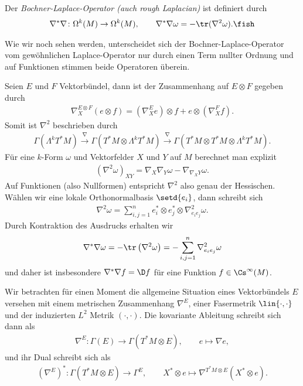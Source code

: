 \documentclass[%
	paper=a5,%
	fleqn,%
	DIV=18,%
	BCOR=0mm,
	fontsize=11pt,
	titlepage=false,%
	bibliography=totoc,
	DIV=18,%
	twoside=true,
	pdftitle=Riemannsche Geometrie,
	pdfauthor=Uwe Semmelmann,
	numbers=noendperiod]%
	{scrbook}
\begin{document}
\begin{defn}
Der \emph{Bochner-Laplace-Operator (auch rough Laplacian)} ist definiert durch
\begin{align*}
\nabla^*\nabla \colon \Omega^k(M)\to \Omega^k(M),\qquad \nabla^*\nabla\omega = - \tr(\nabla^2\omega).\fish
\end{align*}
\end{defn}

Wie wir noch sehen werden, unterscheidet sich der Bochner-Laplace-Operator vom gewöhnlichen Laplace-Operator nur durch einen Term nullter Ordnung und auf Funktionen stimmen beide Operatoren überein.

\begin{rem}
Seien $E$ und $F$ Vektorbündel, dann ist der Zusammenhang auf $E\otimes F$ gegeben durch
\begin{align*}
\nabla_{X}^{E\otimes F} (e\otimes f) = (\nabla_{X}^E e)\otimes f + e\otimes (\nabla_{X}^F f).
\end{align*}
Somit ist $\nabla^2$ beschrieben durch
\begin{align*}
\Gamma(\Lambda^k T^*M) \overset{\nabla}{\longrightarrow}
\Gamma(T^*M\otimes\Lambda^k T^*M) \overset{\nabla}{\longrightarrow}
\Gamma(T^*M\otimes T^*M\otimes\Lambda^k T^*M).
\end{align*}
Für eine $k$-Form $\omega$ und Vektorfelder $X$ und $Y$ auf $M$ berechnet man explizit
\begin{align*}
(\nabla^2\omega)_{XY} = \nabla_{X}\nabla_{Y}\omega - \nabla_{\nabla_{X}Y}\omega.
\end{align*}
Auf Funktionen (also Nullformen) entspricht $\nabla^2$ also genau der Hessischen. Wählen wir eine lokale Orthonormalbasis $\setd{e_{i}}$, dann schreibt sich
\begin{align*}
\nabla^2 \omega = \sum_{i,j=1}^n e_{i}^* \otimes e_{j}^*\otimes \nabla_{e_{i}e_{j}}^2 \omega.
\end{align*}
Durch Kontraktion des Ausdrucks erhalten wir
\begin{align*}
\nabla^*\nabla \omega = - \tr\left(\nabla^2\omega\right) =  -\sum_{i,j=1}^n \nabla_{e_{i}e_{j}}^2\omega
\end{align*}
und daher ist insbesondere $\nabla^*\nabla f = \D f$ für eine Funktion $f\in\Cs^\infty(M)$.\map
\end{rem}

Wir betrachten für einen Moment die allgemeine Situation eines Vektorbündels $E$ versehen mit einem metrischen Zusammenhang $\nabla^E$, einer Fasermetrik $\lin{\cdot,\cdot}$ und der induzierten $L^2$ Metrik $(\cdot,\cdot)$. Die kovariante Ableitung schreibt sich dann als
\begin{align*}
\nabla^E : \Gamma(E)\to \Gamma(T^*M\otimes E),\qquad e\mapsto \nabla e,
\end{align*}
und ihr Dual schreibt sich als
\begin{align*}
(\nabla^E)^* : \Gamma(T^*M\otimes E)\to \Gamma^E,\qquad X^*\otimes e\mapsto \nabla^{T^*M\otimes E} (X^*\otimes e).
\end{align*}
\end{document}
